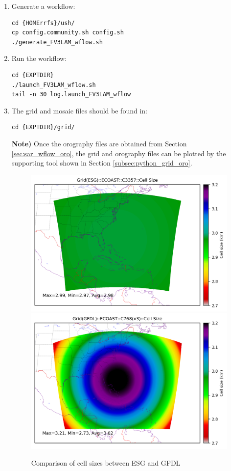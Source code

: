\documentclass[11pt,fleqn]{report}              %
\begin{document}
\begin{enumerate}
\item Generate a workflow:

\lstset{language=bash}   
\begin{lstlisting}[frame=trBL]
cd {HOMErrfs}/ush/
cp config.community.sh config.sh
./generate_FV3LAM_wflow.sh
\end{lstlisting}

\item Run the workflow:

\lstset{language=bash}   
\begin{lstlisting}[frame=trBL]
cd {EXPTDIR}
./launch_FV3LAM_wflow.sh
tail -n 30 log.launch_FV3LAM_wflow
\end{lstlisting}

\item The grid and mosaic files should be found in:

\lstset{language=bash}   
\begin{lstlisting}[frame=trBL]
cd {EXPTDIR}/grid/
\end{lstlisting}

{\bf Note)} Once the orography files are obtained from Section \ref{sec:sar_wflow_oro}, the grid and orography files can be plotted by the supporting tool shown in Section \ref{subsec:python_grid_oro}.


\begin{figure}[ht!]
  \centering
  \includegraphics[width=0.49\linewidth]{fv3_grid_only_ECOAST_esg_C3357_dxy.png}
  \includegraphics[width=0.49\linewidth]{fv3_grid_only_ECOAST_gfdl_C768_dxy.png}
  \caption{Comparison of cell sizes between ESG and GFDL }
  \label{fig:comp_grid_esg_gfdl}
\end{figure}

\end{enumerate}
\end{document}
